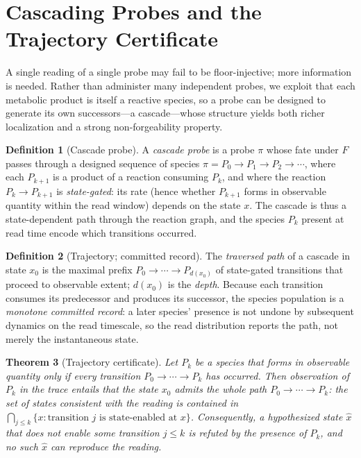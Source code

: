 \documentclass[11pt,a4paper]{article}
\theoremstyle{thmstyle}
\newtheorem{theorem}{Theorem}[section]
\theoremstyle{definition}
\newtheorem{definition}[theorem]{Definition}
\theoremstyle{remark}
\newcommand{\st}{x}                     %
\newcommand{\fld}{F}                    %
\newcommand{\probe}{\pi}                %
\newcommand{\set}[1]{\{#1\}}
\begin{document}
\section{Cascading Probes and the Trajectory Certificate}
\label{sec:cascade}

A single reading of a single probe may fail to be floor-injective; more
information is needed. Rather than administer many independent probes, we
exploit that each metabolic product is itself a reactive species, so a
probe can be designed to generate its own successors---a cascade---whose
structure yields both richer localization and a strong non-forgeability
property.

\begin{definition}[Cascade probe]
\label{def:cascadeprobe}
A \emph{cascade probe} is a probe $\probe$ whose fate under $\fld$ passes
through a designed sequence of species $\probe=P_0\to P_1\to P_2\to\cdots$,
where each $P_{k+1}$ is a product of a reaction consuming $P_k$, and where
the reaction $P_k\to P_{k+1}$ is \emph{state-gated}: its rate (hence
whether $P_{k+1}$ forms in observable quantity within the read window)
depends on the state $\st$. The cascade is thus a state-dependent path
through the reaction graph, and the species $P_k$ present at read time
encode which transitions occurred.
\end{definition}

\begin{definition}[Trajectory; committed record]
\label{def:trajectory}
The \emph{traversed path} of a cascade in state $\st_0$ is the maximal
prefix $P_0\to\cdots\to P_{d(\st_0)}$ of state-gated transitions that
proceed to observable extent; $d(\st_0)$ is the \emph{depth}. Because each
transition consumes its predecessor and produces its successor, the
species population is a \emph{monotone committed record}: a later species'
presence is not undone by subsequent dynamics on the read timescale, so
the read distribution reports the path, not merely the instantaneous
state.
\end{definition}

\begin{theorem}[Trajectory certificate]
\label{thm:certificate}
Let $P_k$ be a species that forms in observable quantity only if every
transition $P_0\to\cdots\to P_k$ has occurred. Then observation of $P_k$ in
the trace \emph{entails} that the state $\st_0$ admits the whole path
$P_0\to\cdots\to P_k$: the set of states consistent with the reading is
contained in $\bigcap_{j\le k}\set{\st : \text{transition } j \text{ is
state-enabled at } \st}$. Consequently, a hypothesized state $\hat\st$ that
does not enable some transition $j\le k$ is \emph{refuted} by the presence
of $P_k$, and no such $\hat\st$ can reproduce the reading.
\end{theorem}
\end{document}
